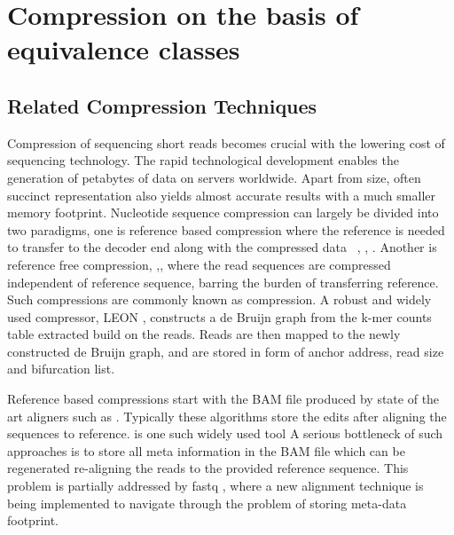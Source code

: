 \chapter{Compression on the basis of equivalence classes}

\section{Related Compression Techniques}
Compression of sequencing short reads becomes crucial with the lowering cost of sequencing technology. The rapid technological development enables the generation of petabytes of data on servers worldwide. Apart from size, often succinct representation \citep{Pritt2016} also yields almost accurate results with a much smaller memory footprint. Nucleotide sequence compression can largely be divided into two paradigms, one is reference based compression where the reference is needed to transfer to the decoder end along with the compressed data ~\citep{Canovas2014}, \citep{Fritz2011}, \citep{Li2014}. Another is reference free compression, \citep{adjeroh2002dna},\citep{Bonfield_2014}, \citep{Hach2012} where the read sequences are compressed independent of reference sequence, barring the burden of transferring reference. Such compressions are commonly known as \Denovo compression. A robust and widely used \denovo compressor, LEON \citep{Benoit2015}, constructs a de Bruijn graph from the k-mer counts table extracted build on the reads. Reads are then mapped to the newly constructed de Bruijn graph, and are stored in form of anchor address, read size and bifurcation list.   

Reference based compressions start with the BAM file produced by state of the art aligners such as \Bowtie. Typically these algorithms store the edits after aligning the sequences to reference. \citet{Fritz2011} is one such widely used tool A serious bottleneck of such approaches is to store all meta information in the BAM file which can be regenerated re-aligning the reads to the provided reference sequence. This problem is partially addressed by fastq \citep{bonfield2013compression}, where a new alignment technique is being implemented to navigate through the problem of storing meta-data footprint. 

